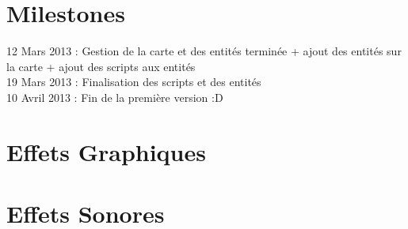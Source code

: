 \documentclass[a4paper]{article}
\begin{document}
      
\newpage
  \part{Milestones}
    12 Mars 2013 : Gestion de la carte et des entités terminée + ajout des entités sur la carte + ajout des scripts aux entités\\
    19 Mars 2013 : Finalisation des scripts et des entités\\
    10 Avril 2013 : Fin de la première version :D\\
      
      
\newpage
  \part{Effets Graphiques}
    
      
\newpage
  \part{Effets Sonores}
\end{document}
